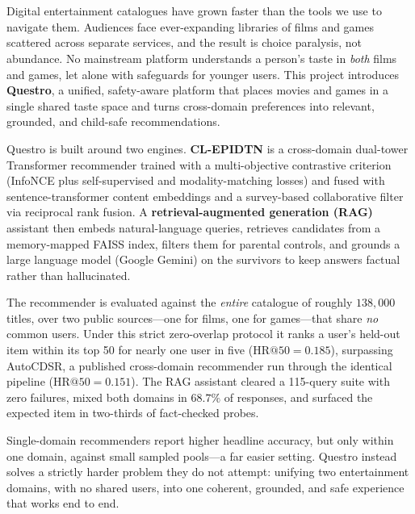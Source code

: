 
\chapter*{}
\noindent Digital entertainment catalogues have grown faster than the tools we use to navigate them. Audiences face ever-expanding libraries of films and games scattered across separate services, and the result is choice paralysis, not abundance. No mainstream platform understands a person's taste in \emph{both} films and games, let alone with safeguards for younger users. This project introduces \textbf{Questro}, a unified, safety-aware platform that places movies and games in a single shared taste space and turns cross-domain preferences into relevant, grounded, and child-safe recommendations.

Questro is built around two engines. \textbf{CL-EPIDTN} is a cross-domain dual-tower Transformer recommender trained with a multi-objective contrastive criterion (InfoNCE plus self-supervised and modality-matching losses) and fused with sentence-transformer content embeddings and a survey-based collaborative filter via reciprocal rank fusion. A \textbf{retrieval-augmented generation (RAG)} assistant then embeds natural-language queries, retrieves candidates from a memory-mapped FAISS index, filters them for parental controls, and grounds a large language model (Google Gemini) on the survivors to keep answers factual rather than hallucinated.

The recommender is evaluated against the \emph{entire} catalogue of roughly $138{,}000$ titles, over two public sources---one for films, one for games---that share \emph{no} common users. Under this strict zero-overlap protocol it ranks a user's held-out item within its top 50 for nearly one user in five ($\mathrm{HR}@50 = 0.185$), surpassing AutoCDSR, a published cross-domain recommender run through the identical pipeline ($\mathrm{HR}@50 = 0.151$). The RAG assistant cleared a 115-query suite with zero failures, mixed both domains in $68.7\%$ of responses, and surfaced the expected item in two-thirds of fact-checked probes.

Single-domain recommenders report higher headline accuracy, but only within one domain, against small sampled pools---a far easier setting. Questro instead solves a strictly harder problem they do not attempt: unifying two entertainment domains, with no shared users, into one coherent, grounded, and safe experience that works end to end.
